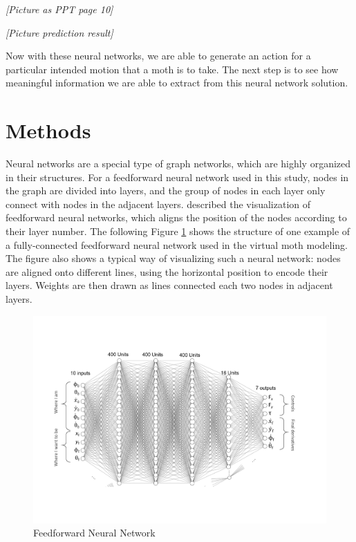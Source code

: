 \documentclass[sigchi]{acmart}
\begin{document}
\emph{\color{blue} [Picture as PPT page 10]}

\emph{\color{blue} [Picture prediction result]}


Now with these neural networks, we are able to generate an action for a particular intended motion that a moth is to take. The next step is to see how meaningful information we are able to extract from this neural network solution.



\section{Methods}
Neural networks are a special type of graph networks, which are highly organized in their structures. For a feedforward neural network used in this study, nodes in the graph are divided into layers, and the group of nodes in each layer only connect with nodes in the adjacent layers. \cite{bischof1992visualization} described the visualization of feedforward neural networks, which aligns the position of the nodes according to their layer number. The following Figure \ref{ffnn} shows the structure of one example of a fully-connected feedforward neural network used in the virtual moth modeling. The figure also shows a typical way of visualizing such a neural network: nodes are aligned onto different lines, using the horizontal position to encode their layers. Weights are then drawn as lines connected each two nodes in adjacent layers.  

\begin{figure}[h]
  \centering
  \includegraphics[width=\linewidth]{ffnn.pdf}
  \caption{Feedforward Neural Network}
  \label{ffnn}
\end{figure}
\end{document}
